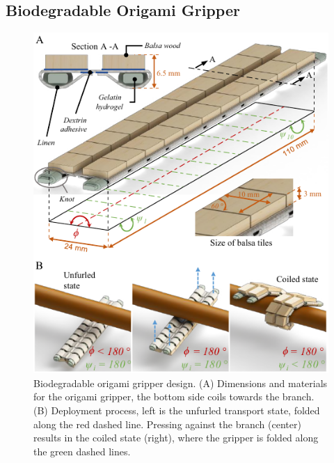 \subsection{Biodegradable Origami Gripper}
\begin{figure}[!t]
\centering
\includegraphics[width=1\columnwidth]{figures/figure3-gripper-design/figure3-gripper-design.pdf}%
\caption{Biodegradable origami gripper design. (A) Dimensions and materials for the origami gripper, the bottom side coils towards the branch. (B) Deployment process, left is the unfurled  transport state, folded along the red dashed line. Pressing against the branch (center) results in the coiled state (right), where the gripper is folded along the green dashed lines.}
\label{fig3_gripper_design}
\end{figure}

